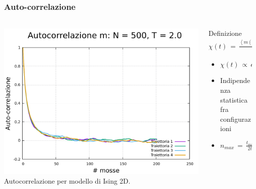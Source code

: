 \begin{frame}
    \frametitle{Auto-correlazione}
    \framesubtitle{}

    \begin{columns}

        \begin{column}{0.55\textwidth}

            \centering
            \includegraphics[width=\textwidth]{Immagini/metodiNumerici/auto_500_2.0.pdf}
            \newline
            {\scriptsize Autocorrelazione per modello di Ising 2D.}

        \end{column}


        \begin{column}{0.45\textwidth}

            \begin{block}{Definizione}
                \centering
                $\chi\left(t\right)\,=\,\frac{\left<m\left(t'\right)m\left(t'\,+\,t\right)\right>_{t'}\,-\,\left<m\right>^2}{\sigma^2_m}$
            \end{block}

            \vspace{0.7cm}

            \begin{itemize}[itemsep=0.5em, label=$\diamond$]
                \item $\chi\left(t\right)\,\propto\,e^{-t/t_c}$
                \item Indipendenza statistica fra configurazioni
                \item $n_{max}\,=\,\frac{t_{max}}{2t_c}$
            \end{itemize}
            
        \end{column}
      \end{columns}
  
\end{frame}